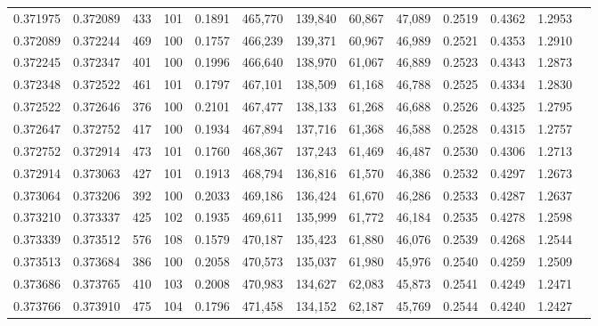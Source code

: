 \begin{tabular}{rrrrrrrrrrrrr}
0.371975 & 0.372089 &   433 & 101 &                                     0.1891 & 465,770 & 139,840 &  60,867 &  47,089 & 0.2519 & 0.4362 & 1.2953 \\
0.372089 & 0.372244 &   469 & 100 &                                     0.1757 & 466,239 & 139,371 &  60,967 &  46,989 & 0.2521 & 0.4353 & 1.2910 \\
0.372245 & 0.372347 &   401 & 100 &                                     0.1996 & 466,640 & 138,970 &  61,067 &  46,889 & 0.2523 & 0.4343 & 1.2873 \\
0.372348 & 0.372522 &   461 & 101 &                                     0.1797 & 467,101 & 138,509 &  61,168 &  46,788 & 0.2525 & 0.4334 & 1.2830 \\
0.372522 & 0.372646 &   376 & 100 &                                     0.2101 & 467,477 & 138,133 &  61,268 &  46,688 & 0.2526 & 0.4325 & 1.2795 \\
0.372647 & 0.372752 &   417 & 100 &                                     0.1934 & 467,894 & 137,716 &  61,368 &  46,588 & 0.2528 & 0.4315 & 1.2757 \\
0.372752 & 0.372914 &   473 & 101 &                                     0.1760 & 468,367 & 137,243 &  61,469 &  46,487 & 0.2530 & 0.4306 & 1.2713 \\
0.372914 & 0.373063 &   427 & 101 &                                     0.1913 & 468,794 & 136,816 &  61,570 &  46,386 & 0.2532 & 0.4297 & 1.2673 \\
0.373064 & 0.373206 &   392 & 100 &                                     0.2033 & 469,186 & 136,424 &  61,670 &  46,286 & 0.2533 & 0.4287 & 1.2637 \\
0.373210 & 0.373337 &   425 & 102 &                                     0.1935 & 469,611 & 135,999 &  61,772 &  46,184 & 0.2535 & 0.4278 & 1.2598 \\
0.373339 & 0.373512 &   576 & 108 &                                     0.1579 & 470,187 & 135,423 &  61,880 &  46,076 & 0.2539 & 0.4268 & 1.2544 \\
0.373513 & 0.373684 &   386 & 100 &                                     0.2058 & 470,573 & 135,037 &  61,980 &  45,976 & 0.2540 & 0.4259 & 1.2509 \\
0.373686 & 0.373765 &   410 & 103 &                                     0.2008 & 470,983 & 134,627 &  62,083 &  45,873 & 0.2541 & 0.4249 & 1.2471 \\
0.373766 & 0.373910 &   475 & 104 &                                     0.1796 & 471,458 & 134,152 &  62,187 &  45,769 & 0.2544 & 0.4240 & 1.2427 \\

\end{tabular}
